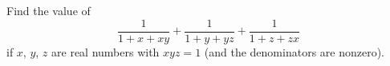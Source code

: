 Find the value of
\[
\dfrac{1}{1+x+xy}+\dfrac{1}{1+y+yz}+\dfrac{1}{1+z+zx}
\]
if $x$, $y$, $z$ are real numbers with $xyz=1$ (and the denominators are nonzero).

